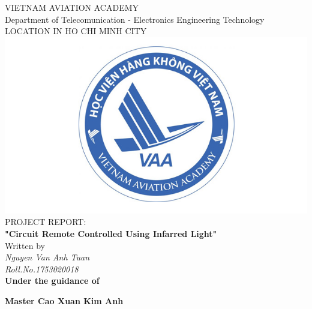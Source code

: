 \documentclass[a4paper]{report}
\begin{document}
    \centering
    \LARGE{\textsc{VIETNAM AVIATION ACADEMY}} \\
    \vspace{3mm}
    \normalsize{Department of Telecomunication - Electronics Engineering Technology} \\
    \vspace{3mm}
    \large{LOCATION IN HO CHI MINH CITY} \\
    \vspace{3mm}
    \includegraphics[scale=0.3]{logo.jpg} \\
    \vspace{3mm}
    \normalsize{PROJECT REPORT:} \\
    \vspace{15mm}
    \huge{\textbf{"Circuit Remote Controlled Using Infarred Light"}} \\
    \vspace{20mm}
    \normalsize{Written by} \\
    \vspace{3mm}
    \large{\textit{Nguyen Van Anh Tuan}} \\ 
    \vspace{3mm}
    \textit{\large{Roll.No.1753020018}} \\
    \vspace{15mm}
    \textbf{\large{Under the guidance of}} \\
    \vspace{10mm}
    \centerline{\textbf{\large{Master Cao Xuan Kim Anh}}}

    \pagestyle{fancy}
    \fancyhf{}
    \cfoot{\today}
    \renewcommand{\headrulewidth}{2pt}
    \renewcommand{\footrulewidth}{1pt}
\end{document}

